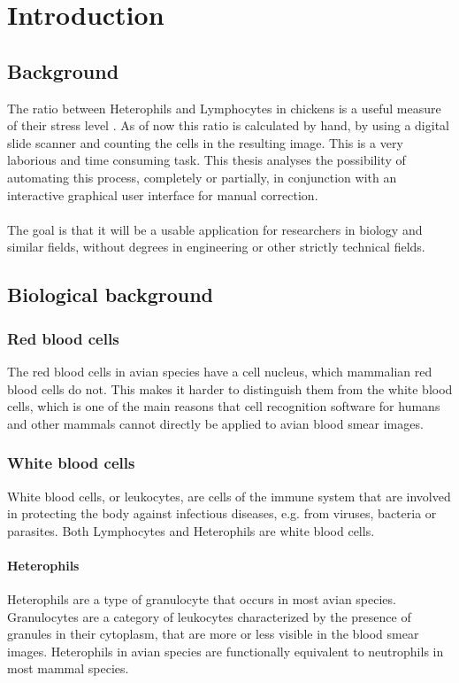 \chapter{Introduction}\label{cha:intro}

\section{Background}
The ratio between Heterophils and Lymphocytes in chickens is a useful measure of their stress level \cite{hlratio}. As of now this ratio is calculated by hand, by using a digital slide scanner and counting the cells in the resulting image. This is a very laborious and time consuming task. This thesis analyses the possibility of automating this process, completely or partially, in conjunction with an interactive graphical user interface for manual correction.\\\\
The goal is that it will be a usable application for researchers in biology and similar fields, without degrees in engineering or other strictly technical fields.

\section{Biological background}
\subsection{Red blood cells}
The red blood cells in avian species have a cell nucleus, which mammalian red blood cells do not. This makes it harder to distinguish them from the white blood cells, which is one of the main reasons that cell recognition software for humans and other mammals cannot directly be applied to avian blood smear images.
\subsection{White blood cells}
White blood cells, or leukocytes, are cells of the immune system that are involved in protecting the body against infectious diseases, e.g. from viruses, bacteria or parasites. Both Lymphocytes and Heterophils are white blood cells.
\subsubsection{Heterophils}
Heterophils are a type of granulocyte that occurs in most avian species. Granulocytes are a category of leukocytes characterized by the presence of granules in their cytoplasm, that are more or less visible in the blood smear images. Heterophils in avian species are functionally equivalent to neutrophils in most mammal species.

